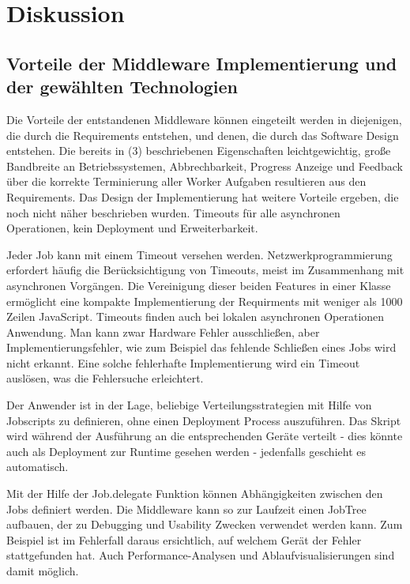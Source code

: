 
\chapter{Diskussion}

\section{Vorteile der Middleware Implementierung und der gewählten Technologien}
Die Vorteile der entstandenen Middleware können eingeteilt werden in diejenigen, die durch die Requirements entstehen, und denen, die durch das Software Design entstehen. Die bereits in (3) beschriebenen Eigenschaften leichtgewichtig, große Bandbreite an Betriebssystemen, Abbrechbarkeit, Progress Anzeige und Feedback über die korrekte Terminierung aller Worker Aufgaben resultieren aus den Requirements.
Das Design der Implementierung hat weitere Vorteile ergeben, die noch nicht näher beschrieben wurden. Timeouts für alle asynchronen Operationen, kein Deployment und Erweiterbarkeit.

Jeder Job kann mit einem Timeout versehen werden. Netzwerkprogrammierung erfordert häufig die Berücksichtigung von Timeouts, meist im Zusammenhang mit asynchronen Vorgängen. Die Vereinigung dieser beiden Features in einer Klasse ermöglicht eine kompakte Implementierung der Requirments mit weniger als 1000 Zeilen JavaScript. Timeouts finden auch bei lokalen asynchronen Operationen Anwendung. Man kann zwar Hardware Fehler ausschließen, aber Implementierungsfehler, wie zum Beispiel das fehlende Schließen eines Jobs wird nicht erkannt. Eine solche fehlerhafte Implementierung wird ein Timeout auslösen, was die Fehlersuche erleichtert.

Der Anwender ist in der Lage, beliebige Verteilungsstrategien mit Hilfe von Jobscripts zu definieren, ohne einen Deployment Process auszuführen. Das Skript wird während der Ausführung an die entsprechenden Geräte verteilt - dies könnte auch als Deployment zur Runtime gesehen werden - jedenfalls geschieht es automatisch.

Mit der Hilfe der Job.delegate Funktion können Abhängigkeiten zwischen den Jobs definiert werden. Die Middleware kann so zur Laufzeit einen JobTree aufbauen, der zu Debugging und Usability Zwecken verwendet werden kann. Zum Beispiel ist im Fehlerfall daraus ersichtlich, auf welchem Gerät der Fehler stattgefunden hat. Auch Performance-Analysen und Ablaufvisualisierungen sind damit möglich.

